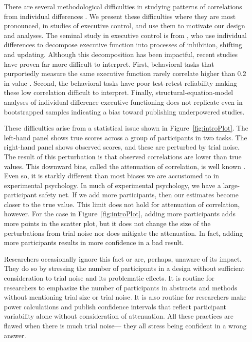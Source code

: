 There are several methodological difficulties in studying patterns of correlations from individual differences \parencite{Rouder.etal.2023}. We present these difficulties where they are most pronounced, in studies of executive control, and use them to motivate our design and analyses.  The seminal study in executive control is from \textcite{Miyake.etal.2000}, who use individual differences to decompose executive function into processes of inhibition, shifting and updating.  Although this decomposition has been impactful, recent studies have proven far more difficult to interpret.  First, behavioral tasks that purportedly measure the same executive function rarely correlate higher than 0.2 in value \parencite{Rey-Mermet.etal.2018,Rouder.etal.2023,Stahl.etal.2014}. Second, the behavioral tasks have poor test-retest reliability \parencite{Draheim.etal.2019, Hedge.etal.2018} making these low correlation difficult to interpret.  Finally, structural-equation-model analyses of individual difference executive functioning does not replicate even in bootstrapped samples indicating a bias toward publishing underpowered studies\parencite{Karr.etal.2018}.   


These difficulties arise from a statistical issue shown in Figure~\ref{fig:introPlot}.  The left-hand panel shows true scores across a group of participants in two tasks.  The right-hand panel shows observed scores, and these are perturbed by trial noise.  The result of this perturbation is that observed correlations are lower than true values.   This downward bias, called the attenuation of correlation, is well known \parencite{Spearman.1904}.  Even so, it is starkly different than most biases we are accustomed to in experimental psychology.  In much of experimental psychology, we have a large-participant safety net.  If we add more participants, then our estimates become closer to the true value.  This limit does not hold for attenuation of correlation, however.  For the case in Figure~\ref{fig:introPlot}, adding more participants adds more points in the scatter plot, but it does not change the size of the perturbations from trial noise nor does mitigate the attenuation.  In fact, adding more participants results in more confidence in a bad result.   

Researchers occasionally ignore this fact or are, perhaps, unaware of its impact.  They do so by stressing the number of participants in a design without sufficient consideration to trial noise and its problematic effects.  It is routine for researchers to emphasize the number of participants in abstracts and methods without mentioning trial size or trial noise.  It is also routine for researchers make power calculations and publish  confidence intervals that reflect participant variability alone without consideration of attenuation.  All these practices are flawed when there is much trial noise--- they all stress being confident in a wrong answer.  

